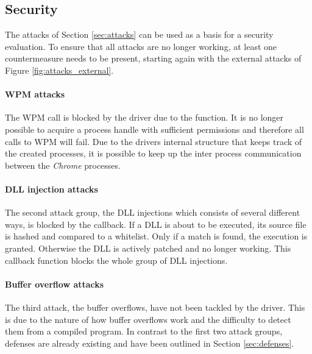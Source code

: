 \subsection{Security}
\label{sec:security}
The attacks of Section \ref{sec:attacks} can be used as a basis for a security evaluation. To ensure that all attacks are no longer working, at least one countermeasure needs to be present, starting again with the external attacks of Figure \ref{fig:attacks_external}. 

\paragraph{\gls{WPM} attacks}
The \gls{WPM} call is blocked by the driver due to the  function. It is no longer possible to acquire a process handle with sufficient permissions and therefore all calls to \gls{WPM} will fail. Due to the drivers internal structure that keeps track of the created processes, it is possible to keep up the inter process communication between the \emph{Chrome} processes. 

\paragraph{\gls{DLL} injection attacks}
The second attack group, the \gls{DLL} injections which consists of several different ways, is blocked by the  callback. If a \gls{DLL} is about to be executed, its source file is hashed and compared to a whitelist. Only if a match is found, the execution is granted. Otherwise the \gls{DLL} is actively patched and no longer working. This callback function blocks the whole group of \gls{DLL} injections.

\paragraph{Buffer overflow attacks}
The third attack, the buffer overflows, have not been tackled by the driver. This is due to the nature of how buffer overflows work and the difficulty to detect them from a compiled program. In contrast to the first two attack groups, defenses are already existing and have been outlined in Section \ref{sec:defenses}.

